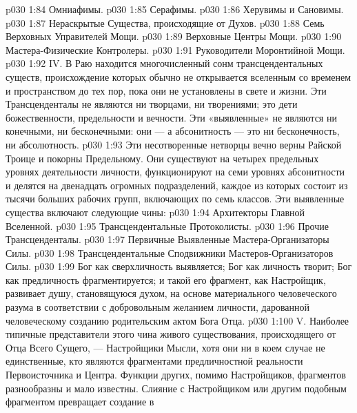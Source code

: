 \vs p030 1:84 \bibnobreakspace Омниафимы.
\vs p030 1:85 \bibnobreakspace Серафимы.
\vs p030 1:86 \bibnobreakspace Херувимы и Сановимы.
\vs p030 1:87 \bibnobreakspace Нераскрытые Существа, происходящие от Духов.
\vs p030 1:88 \bibnobreakspace Семь Верховных Управителей Мощи.
\vs p030 1:89 \bibnobreakspace Верховные Центры Мощи.
\vs p030 1:90 \bibnobreakspace Мастера\hyp{}Физические Контролеры.
\vs p030 1:91 \bibnobreakspace Руководители Моронтийной Мощи.
\vs p030 1:92 \pc IV.  В Раю находится многочисленный сонм трансцендентальных существ, происхождение которых обычно не открывается вселенным со временем и пространством до тех пор, пока они не установлены в свете и жизни. Эти Трансценденталы не являются ни творцами, ни творениями; это  дети божественности, предельности и вечности. Эти «выявленные» не являются ни конечными, ни бесконечными: они ---  а абсонитность --- это ни бесконечность, ни абсолютность.
\vs p030 1:93 Эти несотворенные нетворцы вечно верны Райской Троице и покорны Предельному. Они существуют на четырех предельных уровнях деятельности личности, функционируют на семи уровнях абсонитности и делятся на двенадцать огромных подразделений, каждое из которых состоит из тысячи больших рабочих групп, включающих по семь классов. Эти выявленные существа включают следующие чины:
\vs p030 1:94 \bibnobreakspace Архитекторы Главной Вселенной.
\vs p030 1:95 \bibnobreakspace Трансцендентальные Протоколисты.
\vs p030 1:96 \bibnobreakspace Прочие Трансценденталы.
\vs p030 1:97 \bibnobreakspace Первичные Выявленные Мастера\hyp{}Организаторы Силы.
\vs p030 1:98 \bibnobreakspace Трансцендентальные Сподвижники Мастеров\hyp{}Организаторов Силы.
\vs p030 1:99 \pc Бог как сверхличность выявляется; Бог как личность творит; Бог как предличность фрагментируется; и такой его фрагмент, как Настройщик, развивает душу, становящуюся духом, на основе материального человеческого разума в соответствии с добровольным желанием личности, дарованной человеческому созданию родительским актом Бога Отца.
\vs p030 1:100 \pc V.  Наиболее типичные представители этого чина живого существования, происходящего от Отца Всего Сущего, --- Настройщики Мысли, хотя они ни в коем случае не единственные, кто являются фрагментами предличностной реальности Первоисточника и Центра. Функции других, помимо Настройщиков, фрагментов разнообразны и мало известны. Слияние с Настройщиком или другим подобным фрагментом превращает создание в 
